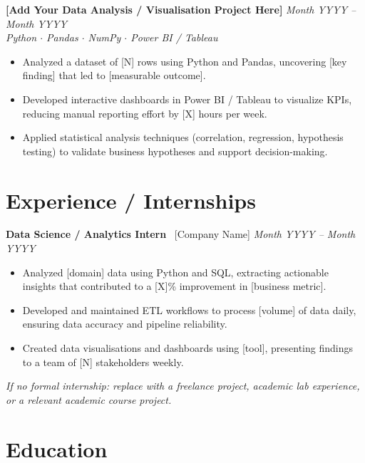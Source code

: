 \documentclass[10pt, letterpaper]{article}
\newcommand{\projheading}[3]{%
  \textbf{#1} \hfill \textit{#3}\\
  \textit{\small #2}
}
\newcommand{\expheading}[3]{%
  \textbf{#1} \textemdash\ #2 \hfill \textit{#3}
}
\begin{document}
\vspace{4pt}
\projheading{[Add Your Data Analysis / Visualisation Project Here]}
            {Python \(\cdot\) Pandas \(\cdot\) NumPy \(\cdot\) Power BI / Tableau}
            {Month YYYY -- Month YYYY}
\begin{itemize}
  \item Analyzed a dataset of [N] rows using Python and Pandas, uncovering [key finding]
        that led to [measurable outcome].
  \item Developed interactive dashboards in Power BI / Tableau to visualize KPIs, reducing
        manual reporting effort by [X] hours per week.
  \item Applied statistical analysis techniques (correlation, regression, hypothesis testing)
        to validate business hypotheses and support decision-making.
\end{itemize}

\section{Experience / Internships}

\expheading{Data Science / Analytics Intern}{[Company Name]}{Month YYYY -- Month YYYY}
\begin{itemize}
  \item Analyzed [domain] data using Python and SQL, extracting actionable insights that
        contributed to a [X]\% improvement in [business metric].
  \item Developed and maintained ETL workflows to process [volume] of data daily, ensuring
        data accuracy and pipeline reliability.
  \item Created data visualisations and dashboards using [tool], presenting findings to a
        team of [N] stakeholders weekly.
\end{itemize}

\textit{\small If no formal internship: replace with a freelance project, academic lab
experience, or a relevant academic course project.}

\section{Education}
\end{document}
